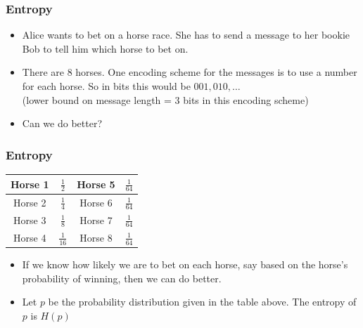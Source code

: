 \documentclass[handout]{beamer}
\begin{document}
\begin{frame}
\frametitle{Entropy}
\begin{itemize}[<+->]
\item Alice wants to bet on a horse race. She has to send a message to
  her bookie Bob to tell him which horse to bet on.
\item There are 8 horses. One encoding scheme for the messages is to
  use a number for each horse. So in bits this would be $001, 010,
  \ldots$\\
(lower bound on message length = 3 bits in this encoding scheme) 
\item Can we do better?
\end{itemize}

\end{frame}

\begin{frame}
\frametitle{Entropy}
\begin{center}
\begin{tabular}{|cc|cc|}
\hline
Horse 1 & $\frac{1}{2}$ & Horse 5 & $\frac{1}{64}$ \\
\hline
Horse 2 & $\frac{1}{4}$ & Horse 6 & $\frac{1}{64}$ \\
\hline
Horse 3 & $\frac{1}{8}$ & Horse 7 & $\frac{1}{64}$ \\
\hline
Horse 4 & $\frac{1}{16}$ & Horse 8 & $\frac{1}{64}$ \\
\hline
\end{tabular}
\end{center}
\begin{itemize}[<+->]
\item If we know how likely we are to bet on each horse, say based on
  the horse's probability of winning, then we can do better.
\item Let $p$ be the probability distribution given in the
table above. The entropy of $p$ is $H(p)$
\end{itemize}

\end{frame}
\end{document}
